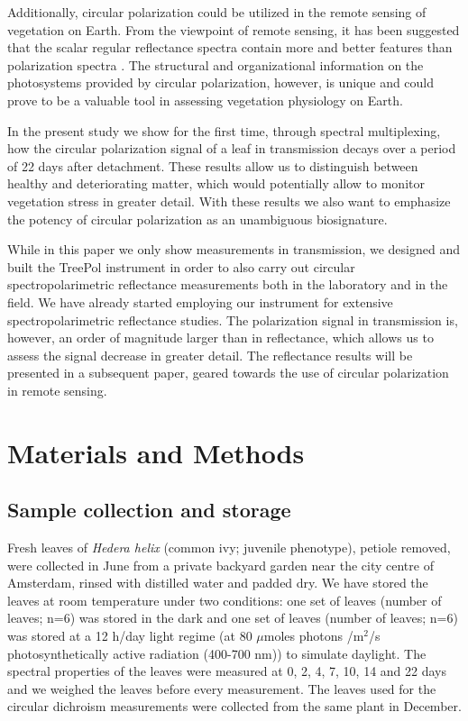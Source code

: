 \documentclass[review]{elsarticle}
\begin{document}
Additionally, circular polarization could be utilized in the remote sensing of vegetation on Earth. From the viewpoint of remote sensing, it has been suggested that the scalar regular reflectance spectra contain more and better features than polarization spectra \cite{Peltoniemi2015}. The structural and organizational information on the photosystems provided by circular  polarization, however, is unique and could prove to be a valuable tool in assessing vegetation physiology on Earth.

In the present study we show for the first time, through spectral multiplexing, how the circular polarization signal of a leaf in transmission decays over a period of 22 days after detachment. These results allow us to distinguish between healthy and deteriorating matter, which would potentially allow to monitor vegetation stress in greater detail. With these results we also want to emphasize the potency of circular polarization as an unambiguous biosignature.  

While in this paper we only show measurements in transmission, we designed and built the TreePol instrument in order to also carry out circular spectropolarimetric reflectance measurements both in the laboratory and in the field. We have already started employing our instrument for extensive spectropolarimetric reflectance studies. The polarization signal in transmission is, however, an order of magnitude larger than in reflectance, which allows us to assess the signal decrease in greater detail. The reflectance results will be presented in a subsequent paper, geared towards the use of circular polarization in remote sensing.  



\section{Materials and Methods}
\subsection{Sample collection and storage}
Fresh leaves of \textit{Hedera helix} (common ivy; juvenile phenotype), petiole removed, were collected in June from a private backyard garden near the city centre of Amsterdam, rinsed with distilled water and padded dry. We have stored the leaves at room temperature under two conditions: one set of leaves (number of leaves; n=6) was stored in the dark and one set of leaves (number of leaves; n=6) was stored at a 12 h/day light regime (at 80 $\mu$moles photons /m$^{2}$/s photosynthetically active radiation (400-700 nm)) to simulate daylight. The spectral properties of the leaves were measured at 0, 2, 4, 7, 10, 14 and 22 days and we weighed the leaves before every measurement. 
The leaves used for the circular dichroism measurements were collected from the same plant in December. 
\end{document}

